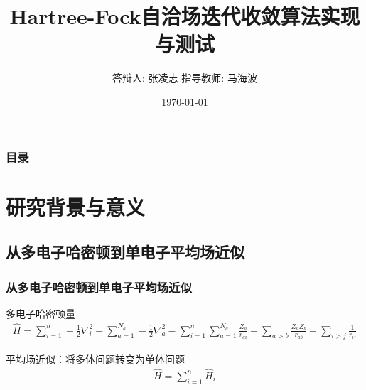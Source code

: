 \documentclass[10pt,aspectratio=43,mathserif,UTF8]{beamer}
\title{Hartree-Fock自洽场迭代收敛算法实现与测试
} %
\author{答辩人: 张凌志 \newline \newline 指导教师: 马海波} %
\institute %
{
南京大学化学化工学院 \\ %
\medskip
}
\date{\today} %
\begin{document}
\begin{frame}
\titlepage %
\end{frame}

\begin{frame}
\frametitle{目录} %
\tableofcontents %
\end{frame}


\section{研究背景与意义} %



\subsection{从多电子哈密顿到单电子平均场近似}
\begin{frame}
	\frametitle{从多电子哈密顿到单电子平均场近似}
	多电子哈密顿量
	\begin{align}
		\hat{H}  = \sum_{i=1}^{n} -\frac{1}{2} \nabla_i ^ {2} + \sum_{a=1}^{N_a} -\frac{1}{2} \nabla_{a} ^ {2} - 
		\sum_{i=1}^{n}\sum_{a=1}^{N_a} \frac{Z_a}{r_{ai}} + \sum_{a>b} \frac{Z_a Z_b}{r_{ab}} + 
		\sum_{i>j} \frac{1}{r_{ij}}
	\end{align}

	平均场近似：将多体问题转变为单体问题
	\begin{align}
		\hat{H}  = \sum_{i=1}^{n} \hat{H}_i
	\end{align}


\end{frame}
\end{document}
